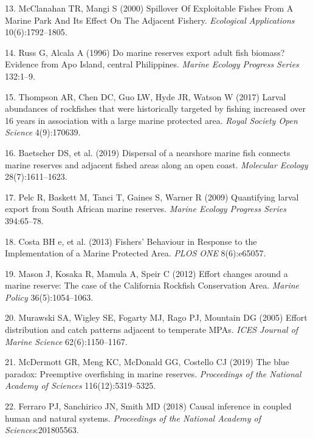 \documentclass[9pt,twocolumn,twoside,lineno]{pnas-new}
\begin{document}
\leavevmode\hypertarget{ref-mcclanahan2000}{}%
13. McClanahan TR, Mangi S (2000) Spillover Of Exploitable Fishes From A
Marine Park And Its Effect On The Adjacent Fishery. \emph{Ecological
Applications} 10(6):1792--1805.

\leavevmode\hypertarget{ref-russ1996}{}%
14. Russ G, Alcala A (1996) Do marine reserves export adult fish
biomass? Evidence from Apo Island, central Philippines. \emph{Marine
Ecology Progress Series} 132:1--9.

\leavevmode\hypertarget{ref-thompson2017}{}%
15. Thompson AR, Chen DC, Guo LW, Hyde JR, Watson W (2017) Larval
abundances of rockfishes that were historically targeted by fishing
increased over 16 years in association with a large marine protected
area. \emph{Royal Society Open Science} 4(9):170639.

\leavevmode\hypertarget{ref-baetscher2019}{}%
16. Baetscher DS, et al. (2019) Dispersal of a nearshore marine fish
connects marine reserves and adjacent fished areas along an open coast.
\emph{Molecular Ecology} 28(7):1611--1623.

\leavevmode\hypertarget{ref-pelc2009}{}%
17. Pelc R, Baskett M, Tanci T, Gaines S, Warner R (2009) Quantifying
larval export from South African marine reserves. \emph{Marine Ecology
Progress Series} 394:65--78.

\leavevmode\hypertarget{ref-costa2013}{}%
18. Costa BH e, et al. (2013) Fishers' Behaviour in Response to the
Implementation of a Marine Protected Area. \emph{PLOS ONE} 8(6):e65057.

\leavevmode\hypertarget{ref-mason2012}{}%
19. Mason J, Kosaka R, Mamula A, Speir C (2012) Effort changes around a
marine reserve: The case of the California Rockfish Conservation Area.
\emph{Marine Policy} 36(5):1054--1063.

\leavevmode\hypertarget{ref-murawski2005}{}%
20. Murawski SA, Wigley SE, Fogarty MJ, Rago PJ, Mountain DG (2005)
Effort distribution and catch patterns adjacent to temperate MPAs.
\emph{ICES Journal of Marine Science} 62(6):1150--1167.

\leavevmode\hypertarget{ref-mcdermott2019}{}%
21. McDermott GR, Meng KC, McDonald GG, Costello CJ (2019) The blue
paradox: Preemptive overfishing in marine reserves. \emph{Proceedings of
the National Academy of Sciences} 116(12):5319--5325.

\leavevmode\hypertarget{ref-ferraro2018}{}%
22. Ferraro PJ, Sanchirico JN, Smith MD (2018) Causal inference in
coupled human and natural systems. \emph{Proceedings of the National
Academy of Sciences}:201805563.
\end{document}
